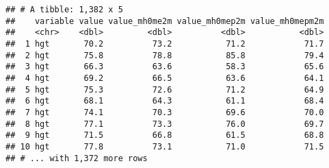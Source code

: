 \documentclass[
]{book}
\newenvironment{Shaded}{\begin{snugshade}}{\end{snugshade}}
\newcommand{\DataTypeTok}[1]{\textcolor[rgb]{0.13,0.29,0.53}{#1}}
\newcommand{\DecValTok}[1]{\textcolor[rgb]{0.00,0.00,0.81}{#1}}
\newcommand{\KeywordTok}[1]{\textcolor[rgb]{0.13,0.29,0.53}{\textbf{#1}}}
\newcommand{\NormalTok}[1]{#1}
\newcommand{\OperatorTok}[1]{\textcolor[rgb]{0.81,0.36,0.00}{\textbf{#1}}}
\newcommand{\StringTok}[1]{\textcolor[rgb]{0.31,0.60,0.02}{#1}}
\begin{document}
\begin{Shaded}
\end{Shaded}

\begin{verbatim}
## # A tibble: 1,382 x 5
##    variable value value_mh0me2m value_mh0mep2m value_mh0mepm2m
##    <chr>    <dbl>         <dbl>          <dbl>           <dbl>
##  1 hgt       70.2          73.2           71.2            71.7
##  2 hgt       75.8          78.8           85.8            79.4
##  3 hgt       66.3          63.6           58.3            65.6
##  4 hgt       69.2          66.5           63.6            64.1
##  5 hgt       75.3          72.6           71.2            64.9
##  6 hgt       68.1          64.3           61.1            68.4
##  7 hgt       74.1          70.3           69.6            70.0
##  8 hgt       77.1          73.3           76.0            69.7
##  9 hgt       71.5          66.8           61.5            68.8
## 10 hgt       77.8          73.1           71.0            71.5
## # ... with 1,372 more rows
\end{verbatim}

\begin{Shaded}
\end{Shaded}
\end{document}
